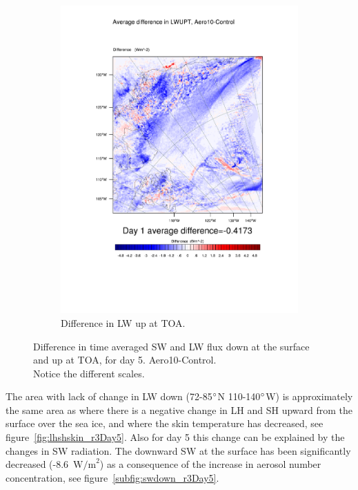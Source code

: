\begin{figure}
\begin{subfigure}{0.48\textwidth}
		\includegraphics[width=\textwidth]{results/aero10/diff_Aero10_LWUPT_Day5.pdf}
		\caption{Difference in LW up at TOA.}
		\label{subfig:lwup_r3Day5}
	\end{subfigure}
	\caption{Difference in time averaged SW and LW flux down at the surface and up at TOA, for day 5. Aero10-Control.\\Notice the different scales.}
	\label{fig:radiation_r3Day5}
\end{figure}

The area with lack of change in LW down (72-85$\degree$N 110-140$\degree$W) is approximately the same area as where there is a negative change in LH and SH upward from the surface over the sea ice, and where the skin temperature has decreased, see figure~\ref{fig:lhshskin_r3Day5}. Also for day 5 this change can be explained by the changes in SW radiation. The downward SW at the surface has been significantly decreased (-8.6~$\text{W/m}^2$) as a consequence of the increase in aerosol number concentration, see figure~\ref{subfig:swdown_r3Day5}.

